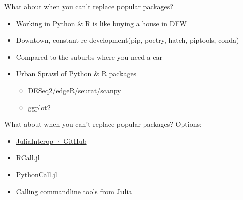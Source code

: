 \documentclass[bigger]{beamer}
\begin{document}
\begin{frame}[label={sec:org7799271}]{What about when you can't replace popular packages?}
\pause
\begin{itemize}
\item Working in Python \& R is like buying a \uline{house in DFW}
\end{itemize}
\pause
\begin{itemize}
\item Downtown, constant re-development(pip, poetry, hatch, piptools, conda)
\end{itemize}
\pause
\begin{itemize}
\item Compared to the suburbs where you need a car
\end{itemize}

\pause
\begin{itemize}
\item Urban Sprawl of Python \& R packages
\begin{itemize}
\item DESeq2/edgeR/seurat/scanpy
\item ggplot2
\end{itemize}
\end{itemize}


\end{frame}

\begin{frame}[label={sec:org60173b7}]{What about when you can't replace popular packages?}
Options:
\begin{itemize}
\item \href{https://github.com/JuliaInterop}{JuliaInterop · GitHub}
\item \href{https://juliainterop.github.io/RCall.jl/stable/gettingstarted/}{RCall.jl}
\end{itemize}

\begin{itemize}
\item PythonCall.jl

\item Calling commandline tools from Julia
\end{itemize}

\end{frame}
\end{document}
